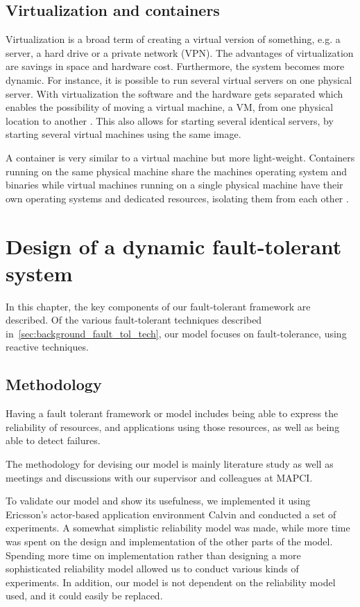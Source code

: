 \documentclass{cslthse-msc}
\begin{document}
\section{Virtualization and containers} \label{sec:background_virtualization}
Virtualization is a broad term of creating a virtual version of something, e.g. a server, a hard drive or a private network (VPN). The advantages of virtualization are savings in space and hardware cost. Furthermore, the system becomes more dynamic. For instance, it is possible to run several virtual servers on one physical server. With virtualization the software and the hardware gets separated which enables the possibility of moving a virtual machine, a VM, from one physical location to another \cite{virtualMachine}. This also allows for starting several identical servers, by starting several virtual machines using the same image.

A container is very similar to a virtual machine but more light-weight. Containers running on the same physical machine share the machines operating system and binaries while virtual machines running on a single physical machine have their own operating systems and dedicated resources, isolating them from each other \cite{vm_vs_container}. 

\chapter{Design of a dynamic fault-tolerant system} \label{ch:design}
In this chapter, the key components of our fault-tolerant framework are described. Of the various fault-tolerant techniques described in~\cref{sec:background_fault_tol_tech}, our model focuses on fault-tolerance, using reactive techniques.

\section{Methodology} \label{sec:design_methodology}
Having a fault tolerant framework or model includes being able to express the reliability of resources, and applications using those resources, as well as being able to detect failures. 

The methodology for devising our model is mainly literature study as well as meetings and discussions with our supervisor and colleagues at MAPCI.

To validate our model and show its usefulness, we implemented it using Ericsson's actor-based application environment Calvin \cite{calvin} and conducted a set of experiments. A somewhat simplistic reliability model was made, while more time was spent on the design and implementation of the other parts of the model. Spending more time on implementation rather than designing a more sophisticated reliability model allowed us to conduct various kinds of experiments. In addition, our model is not dependent on the reliability model used, and it could easily be replaced.
\end{document}
